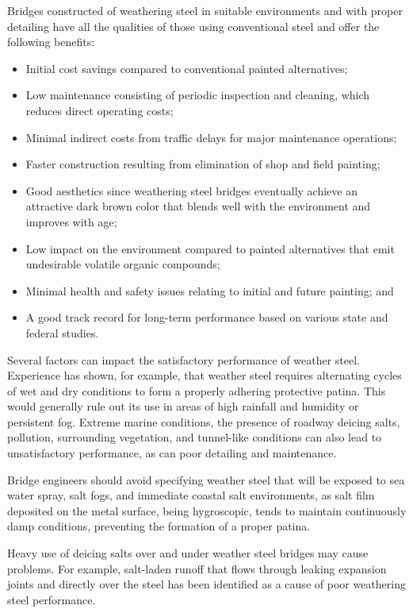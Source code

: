 Bridges constructed of weathering steel in suitable environments and with proper detailing have all the qualities
of those using conventional steel and offer the following benefits:

\begin{itemize}
  \item Initial cost savings compared to conventional painted alternatives;
  \item Low maintenance consisting of periodic inspection and cleaning, which reduces direct operating costs;
  \item Minimal indirect costs from traffic delays for major maintenance operations;
  \item Faster construction resulting from elimination of shop and field painting;
  \item Good aesthetics since weathering steel bridges eventually achieve an attractive dark brown color that blends well with the environment and improves with age;
  \item Low impact on the environment compared to painted alternatives that emit undesirable volatile organic compounds;
  \item Minimal health and safety issues relating to initial and future painting; and
  \item A good track record for long-term performance based on various state and federal studies.
\end{itemize}

Several factors can impact the satisfactory performance of weather steel. Experience has shown, for example,
that weather steel requires alternating cycles of wet and dry conditions to form a properly adhering protective patina.
This would generally rule out its use in areas of high rainfall and humidity or persistent fog. Extreme marine
conditions, the presence of roadway deicing salts, pollution, surrounding vegetation, and tunnel-like conditions can
also lead to unsatisfactory performance, as can poor detailing and maintenance.

Bridge engineers should avoid specifying weather steel that will be exposed to sea water spray, salt fogs, and
immediate coastal salt environments, as salt film deposited on the metal surface, being hygroscopic, tends to maintain
continuously damp conditions, preventing the formation of a proper patina.

Heavy use of deicing salts over and under weather steel bridges may cause problems. For example, salt-laden
runoff that flows through leaking expansion joints and directly over the steel has been identified as a cause of poor
weathering steel performance.

